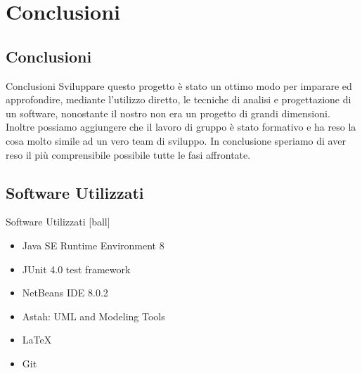 \section {Conclusioni}
\subsection{Conclusioni}
 \begin{frame} {Conclusioni}
  Sviluppare questo progetto è stato un ottimo modo per imparare ed approfondire, mediante l'utilizzo diretto, le tecniche di analisi e progettazione di un software, 
  nonostante il nostro non era un progetto di grandi dimensioni. Inoltre possiamo aggiungere che il lavoro di gruppo è stato formativo e ha reso la cosa molto simile 
  ad un vero team di sviluppo. In conclusione speriamo di aver reso il più comprensibile possibile tutte le fasi affrontate.
 \end{frame}

\subsection{Software Utilizzati}
 \begin{frame} {Software Utilizzati}
  [ball]
  \begin{itemize} 
    \item Java SE Runtime Environment 8
    \item JUnit 4.0 test framework
    \item NetBeans IDE 8.0.2 
    \item Astah: UML and Modeling Tools
    \item \LaTeX
    \item Git
   \end{itemize}
 \end{frame}


